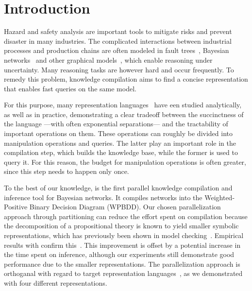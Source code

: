 
\section{Introduction}
\label{sec:introduction}

Hazard and safety analysis are important tools to mitigate risks and prevent disaster in many industries. The complicated interactions between industrial processes and production chains are often modeled in fault trees~\cite{ruijters2015fault}, Bayesian networks~\cite{pearl2011bayesian} and other graphical models~\cite{kollerfriedman2009}, which enable reasoning under uncertainty.
Many reasoning tasks are however hard and occur frequently. To remedy this problem, knowledge compilation aims to find a concise representation that enables fast queries on the same model.

For this purpose, many representation languages~\cite{darwiche2001decomposable,darwiche2002logical,darwiche2011sdd,darwiche2002knowledge,fargier2014knowledge,sanner2005affine,tafertshofer1997factored} have een studied analytically, as well as in practice, demonstrating a clear tradeoff between the succinctness of the language ---with often exponential separations--- and the tractability of important operations on them. These operations can roughly be divided into manipulation operations and queries. The latter play an important role in the compilation step, which builds the knowledge base, while the former is used to query it. For this reason, the budget for manipulation operations is often greater, since this step needs to happen only once.

To the best of our knowledge, \toolname is the first parallel knowledge compilation and inference tool for Bayesian networks. It compiles networks into the Weighted-Positive Binary Decision Diagram (WPBDD). Our chosen parallelization approach through partitioning can reduce the effort spent on compilation because the decomposition of a propositional theory is known to yield smaller symbolic representations, which has previously been shown in model checking~\cite{narayan1996partitioned,sahoo2004partitioning,grumberg2006work}. Empirical results with \toolname confirm this~\cite{dal2017reducing}.
 This improvement is offset by a potential increase in the time spent on inference, although our experiments still demonstrate good performance due to the smaller representations. The parallelization approach is orthoganal with regard to target representation languages~\cite{dal2018parallel}, as we demonstrated with four different representations.

